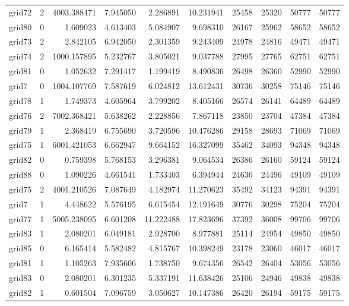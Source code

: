 \begin{longtable}{|l|r|r|r|r|r|r|r|r|r|}
grid72 & 2 & 4003.388471 & 7.945050 & 2.286891 & 10.231941 & 25458 & 25320 & 50777 & 50777 \\
grid80 & 0 & 1.609023 & 4.613403 & 5.084907 & 9.698310 & 26167 & 25962 & 58652 & 58652 \\
grid73 & 2 & 2.842105 & 6.942050 & 2.301359 & 9.243409 & 24978 & 24816 & 49471 & 49471 \\
grid74 & 2 & 1000.157895 & 5.232767 & 3.805021 & 9.037788 & 27995 & 27765 & 62751 & 62751 \\
grid81 & 0 & 1.052632 & 7.291417 & 1.199419 & 8.490836 & 26498 & 26360 & 52990 & 52990 \\
grid7 & 0 & 1004.107769 & 7.587619 & 6.024812 & 13.612431 & 30736 & 30258 & 75146 & 75146 \\
grid78 & 1 & 1.749373 & 4.605964 & 3.799202 & 8.405166 & 26574 & 26141 & 64489 & 64489 \\
grid76 & 2 & 7002.368421 & 5.638262 & 2.228856 & 7.867118 & 23850 & 23704 & 47384 & 47384 \\
grid79 & 1 & 2.368419 & 6.755690 & 3.720596 & 10.476286 & 29158 & 28693 & 71069 & 71069 \\
grid75 & 1 & 6001.421053 & 6.662947 & 9.664152 & 16.327099 & 35462 & 34093 & 94348 & 94348 \\
grid82 & 0 & 0.759398 & 5.768153 & 3.296381 & 9.064534 & 26386 & 26160 & 59124 & 59124 \\
grid88 & 0 & 1.090226 & 4.661541 & 1.733403 & 6.394944 & 24636 & 24496 & 49109 & 49109 \\
grid75 & 2 & 4001.210526 & 7.087649 & 4.182974 & 11.270623 & 35492 & 34123 & 94391 & 94391 \\
grid7 & 1 & 4.448622 & 5.576195 & 6.615454 & 12.191649 & 30776 & 30298 & 75204 & 75204 \\
grid77 & 1 & 5005.238095 & 6.601208 & 11.222488 & 17.823696 & 37392 & 36008 & 99706 & 99706 \\
grid83 & 1 & 2.080201 & 6.049181 & 2.928700 & 8.977881 & 25114 & 24954 & 49850 & 49850 \\
grid85 & 0 & 6.165414 & 5.582482 & 4.815767 & 10.398249 & 23178 & 23060 & 46017 & 46017 \\
grid81 & 1 & 1.105263 & 7.935606 & 1.738750 & 9.674356 & 26542 & 26404 & 53056 & 53056 \\
grid83 & 0 & 2.080201 & 6.301235 & 5.337191 & 11.638426 & 25106 & 24946 & 49838 & 49838 \\
grid82 & 1 & 0.601504 & 7.096759 & 3.050627 & 10.147386 & 26420 & 26194 & 59175 & 59175 \\

\end{longtable}
